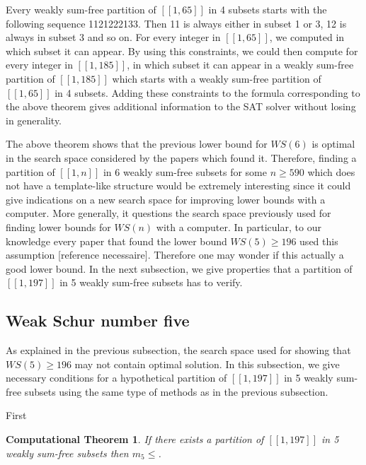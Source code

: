 \documentclass{article}
\newtheorem{computational theorem}{Computational Theorem}[theorem]
\begin{document}
\par
Every weakly sum-free partition of \([\![1,65]\!]\) in 4 subsets starts with the following sequence 1121222133. Then 11 is always 
either in subset 1 or 3, 12 is always in subset 3 and so on. For every integer in \([\![1,65]\!]\), we computed in which subset it can appear. 
By using this constraints, we could then compute for every integer in \([\![1,185]\!]\), in which subset it can appear in a weakly sum-free 
partition of  \([\![1,185]\!]\) which starts with a  weakly sum-free partition of \([\![1,65]\!]\) in 4 subsets. Adding these constraints to the 
formula corresponding to the above theorem gives additional information to the SAT solver without losing in generality.

\par
The above theorem shows that the previous lower bound for \(WS(6)\) is optimal in the search space considered by the papers which found it. 
Therefore, finding a partition of \([\![1,n]\!]\) in 6 weakly sum-free subsets for some \(n \geq 590\) which does not have a template-like structure 
would be extremely interesting since it could give indications on a new search space for improving lower bounds with a computer. More generally, 
it questions the search space previously used for finding lower bounds for \(WS(n)\) with a computer. In particular, to our knowledge every paper 
that found the lower bound \(WS(5) \geq 196\) used this assumption [reference necessaire]. Therefore one may wonder if this actually a good lower 
bound. In the next subsection, we give properties that a partition of \([\![1,197]\!]\) in 5 weakly sum-free subsets has to verify.


\subsection{Weak Schur number five}
As explained in the previous subsection, the search space used for showing that  \(WS(5) \geq 196\) may not contain optimal solution. In this subsection, 
we give necessary conditions for a hypothetical partition of \([\![1,197]\!]\) in 5 weakly sum-free subsets using the same type of methods as in the
 previous subsection.

\par
First

\begin{computational theorem}
If there exists a partition of \([\![1,197]\!]\) in 5 weakly sum-free subsets then \(m_5 \leq\). 
\end{computational theorem}
\end{document}
